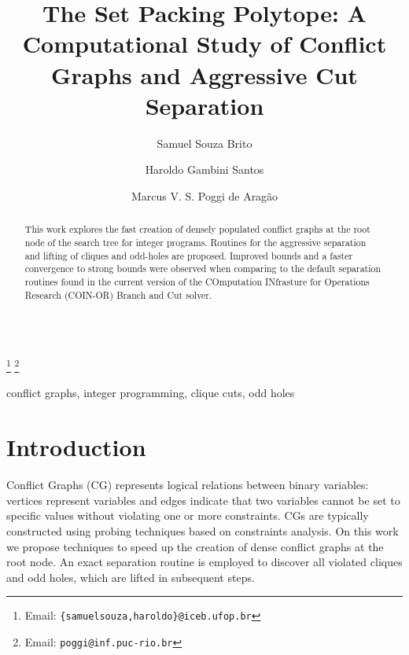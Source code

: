 \documentclass{endm}
\begin{document}
  

\begin{verbatim}\end{verbatim}\vspace{2.5cm}

\begin{frontmatter}

\title{The Set Packing Polytope: A Computational Study of Conflict Graphs and Aggressive Cut Separation}
\author{Samuel Souza Brito \and Haroldo Gambini Santos}
\address{{\small Departamento de Computação, Universidade Federal de Ouro Preto - UFOP}}
\author{Marcus V. S. Poggi de Aragão}
\address{{\small Dep. de Informática, Pontifícia Universidade Católica do Rio de Janeiro}}
\thanks[mailSamuelHaroldo]{Email: {\texttt{\normalshape \{samuelsouza,haroldo\}@iceb.ufop.br}}} 
\thanks[mailPoggi]{Email: {\texttt{\normalshape poggi@inf.puc-rio.br}}}  

\begin{abstract}
This work explores the fast creation of densely populated conflict graphs at the root node of the search tree for integer programs. Routines for the aggressive separation and lifting of cliques and odd-holes are proposed. Improved bounds and a faster convergence to strong bounds were observed when comparing to the default separation routines found in the current version of the COmputation INfrasture for Operations Research (COIN-OR) Branch and Cut solver.
\end{abstract}

\begin{keyword}
conflict graphs, integer programming, clique cuts, odd holes
\end{keyword}

\end{frontmatter}


\section{Introduction}\label{intro}

Conflict Graphs (CG) represents logical relations between binary variables: vertices represent variables and edges indicate that two variables cannot be set to specific values without violating one or more constraints. CGs are typically constructed using probing techniques\cite{Borndorfer1998} based on constraints analysis. On this work we propose techniques to speed up the creation of dense conflict graphs at the root node. An exact separation routine is employed to discover all violated cliques and odd holes, which are lifted in subsequent steps.
\end{document}
